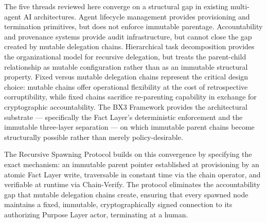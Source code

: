 The five threads reviewed here converge on a structural gap in existing multi-agent AI architectures. Agent lifecycle management provides provisioning and termination primitives, but does not enforce immutable parentage. Accountability and provenance systems provide audit infrastructure, but cannot close the gap created by mutable delegation chains. Hierarchical task decomposition provides the organizational model for recursive delegation, but treats the parent-child relationship as mutable configuration rather than as an immutable structural property. Fixed versus mutable delegation chains represent the critical design choice: mutable chains offer operational flexibility at the cost of retrospective corruptibility, while fixed chains sacrifice re-parenting capability in exchange for cryptographic accountability. The BX3 Framework provides the architectural substrate — specifically the Fact Layer's deterministic enforcement and the immutable three-layer separation — on which immutable parent chains become structurally possible rather than merely policy-desirable.

The Recursive Spawning Protocol builds on this convergence by specifying the exact mechanism: an immutable parent pointer established at provisioning by an atomic Fact Layer write, traversable in constant time via the chain operator, and verifiable at runtime via Chain-Verify. The protocol eliminates the accountability gap that mutable delegation chains create, ensuring that every spawned node maintains a fixed, immutable, cryptographically signed connection to its authorizing Purpose Layer actor, terminating at a human.

